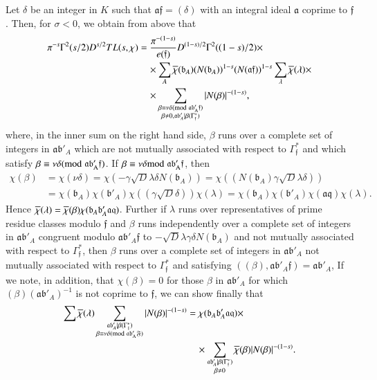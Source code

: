 Let $\delta$ be an integer in $K$ such that $\mathfrak{af}=(\delta)$
with an integral ideal $\mathfrak{a}$ coprime to $\mathfrak{f}$. Then,
for $\sigma<0$, we obtain from above that
\begin{align*}
\pi^{-s}\Gamma^{2}(s/2)D^{s/2}TL(s,\chi) &=
\frac{\pi^{-(1-s)}}{e(\mathfrak{f})}D^{(1-s)/2}\Gamma^{2}((1-s)/2)\times\\
&\quad
\times\sum_{A}\overline{\chi}(\mathfrak{b}_{A})(N(\mathfrak{b}_{A}))^{1-s}(N(\mathfrak{af}))^{1-s}\sum_{\lambda}\overline{\chi}(\lambda)\times\\
&\quad \times \sum_{\substack{\beta\equiv \nu\delta(\rm{mod} \;
    \mathfrak{ab}'_{A}\mathfrak{f})\\ \beta\neq 0,\mathfrak{ab}'_{A}|\beta(\Gamma^{\ast}_{\mathfrak{f}})}}|N(\beta)|^{-(1-s)},
\end{align*}\pageoriginale
where, in the inner sum on the right hand side, $\beta$ runs over a
complete set of integers in $\mathfrak{ab}'_{A}$ which are not
mutually associated with respect to $\Gamma^{\ast}_{\mathfrak{f}}$ and
which satisfy $\beta\equiv \nu\delta(\rm{mod} \;
\mathfrak{ab}'_{A}\mathfrak{f})$. If $\beta\equiv\nu\delta\rm{mod} \;
\mathfrak{ab}'_{A}\mathfrak{f}$, then
\begin{align*}
\chi(\beta) &= \chi(\nu\delta)=\chi(-\gamma\sqrt{D}\lambda\delta
N(\mathfrak{b}_{A}))=\chi((N(\mathfrak{b}_{A})\gamma\sqrt{D}\lambda\delta))\\
&=
\chi(\mathfrak{b}_{A})\chi(\mathfrak{b}'_{A})\chi((\gamma\sqrt{D}\delta))\chi(\lambda)=\chi(\mathfrak{b}_{A})\chi(\mathfrak{b}'_{A})\chi(\mathfrak{aq})\chi(\lambda). 
\end{align*}
Hence
$\overline{\chi}(\lambda)=\overline{\chi}(\beta)\chi(\mathfrak{b}_{A}\mathfrak{b}'_{A}\mathfrak{aq})$. Further
if $\lambda$ runs over representatives of prime residue classes modulo
$\mathfrak{f}$ and $\beta$ runs independently over a complete set of
integers in $\mathfrak{ab}'_{A}$ congruent modulo
$\mathfrak{ab}'_{A}\mathfrak{f}$ to $-\sqrt{D}\lambda\gamma\delta
N(\mathfrak{b}_{A})$ and not mutually associated with respect to
$\Gamma^{\ast}_{\mathfrak{f}}$, then $\beta$ runs over a complete set
of integers in $\mathfrak{ab}'_{A}$ not mutually associated with
respect to $\Gamma^{\ast}_{\mathfrak{f}}$ and satisfying
$((\beta),\mathfrak{ab}'_{A}\mathfrak{f})=\mathfrak{ab}'_{A}$, If we
note, in addition, that $\chi(\beta)=0$ for those $\beta$ in
$\mathfrak{ab}'_{A}$ for which $(\beta)(\mathfrak{ab}'_{A})^{-1}$ is
not coprime to $\mathfrak{f}$, we can show finally that
\begin{align*}
\sum\overline{\chi}(\lambda)\sum_{\substack{\mathfrak{ab}'_{A}|\beta(\Gamma^{\ast}_{1})\\ \beta\equiv
\nu\delta(\rm{mod} \; \mathfrak{ab}'_{A}\mathfrak{F})}}|N(\beta)|^{-(1-s)} &=
\chi(\mathfrak{b}_{A}\mathfrak{b}'_{A}\mathfrak{aq})\times\\
&\quad \times
\sum_{\substack{\mathfrak{ab}'_{A}|\beta(\Gamma^{\ast}_{\mathfrak{f}})\\ \beta\neq
0}}\overline{\chi}(\beta)|N(\beta)|^{-(1-s)}.
\end{align*}
